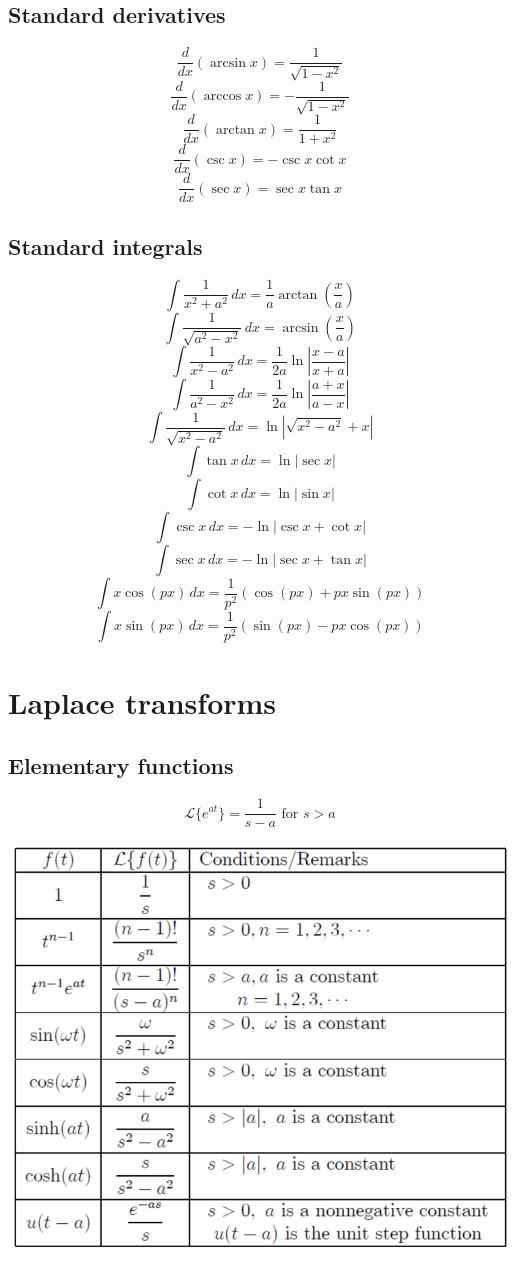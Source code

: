 \documentclass[11pt]{article}
\begin{document}
\subsection{Standard derivatives}
\label{sec:orgc328dd0}
\[\frac{d}{dx} \left(\arcsin x \right) = \frac{1}{\sqrt{1 - x^2}}\]
\[\frac{d}{dx} \left(\arccos x \right) = - \frac{1}{\sqrt{1 - x^2}}\]
\[\frac{d}{dx} \left(\arctan x \right) = \frac{1}{1 + x^2}\]
\[\frac{d}{dx} \left(\csc x \right) = - \csc x \cot x\]
\[\frac{d}{dx} \left(\sec x \right) = \sec x \tan x\]

\subsection{Standard integrals}
\label{sec:org02edf22}
\[\int \frac{1}{x^2 + a^2} \, dx = \frac{1}{a} \arctan \left(\frac{x}{a} \right)\]
\[\int \frac{1}{\sqrt{a^2 - x^2}} \, dx = \arcsin \left(\frac{x}{a} \right)\]
\[\int \frac{1}{x^2 - a^2} \, dx = \frac{1}{2a} \ln \left|\frac{x - a}{x + a} \right|\]
\[\int \frac{1}{a^2 - x^2} \, dx = \frac{1}{2a} \ln \left|\frac{a + x}{a - x} \right|\]
\[\int \frac{1}{\sqrt{x^2 - a^2}} \, dx = \ln \left|\sqrt{x^2 - a^2} + x \right|\]
\[\int \tan x \, dx = \ln |\sec x|\]
\[\int \cot x \, dx = \ln |\sin x|\]
\[\int \csc x \, dx = - \ln |\csc x + \cot x|\]
\[\int \sec x \, dx = - \ln |\sec x + \tan x|\]
\[\int x \cos (px) \, dx = \frac{1}{p^2} (\cos (px) + px \sin (px))\]
\[\int x \sin (px) \, dx = \frac{1}{p^2} (\sin (px) - px \cos (px))\]

 \newpage

\section{Laplace transforms}
\label{sec:orgc8a4293}

\subsection{Elementary functions}
\label{sec:orgb47a255}
\[\mathcal{L} \{ e^{at} \} = \frac{1}{s - a} \text{ for } s > a\]
\begin{center}
\includegraphics[width=.9\linewidth]{./images/laplace-transform-of-elementary-functions.png}
\end{center}
\end{document}
